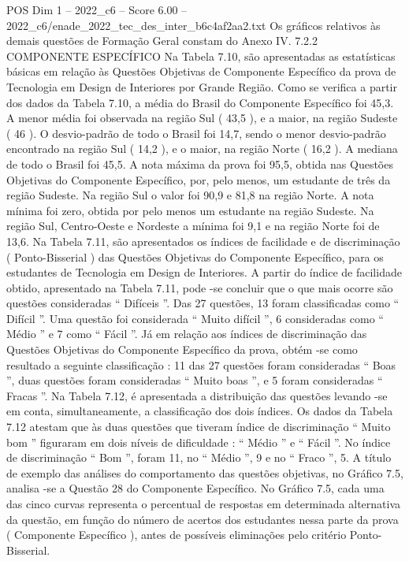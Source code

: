 \begin{textsample}{POS Dim 1 – 2022\_c6 – Score 6.00 – 2022\_c6/enade\_2022\_tec\_des\_inter\_b6c4af2aa2.txt}
Os gráficos relativos às demais questões de Formação Geral constam do Anexo IV. 7.2.2 COMPONENTE ESPECÍFICO Na Tabela 7.10, são apresentadas as estatísticas básicas em relação às Questões Objetivas de Componente Específico da prova de Tecnologia em Design de Interiores por Grande Região.
Como se verifica a partir dos dados da Tabela 7.10, a média do Brasil do Componente Específico foi 45,3.
A menor média foi observada na região Sul ( 43,5 ), e a maior, na região Sudeste ( 46 ).
O desvio-padrão de todo o Brasil foi 14,7, sendo o menor desvio-padrão encontrado na região Sul ( 14,2 ), e o maior, na região Norte ( 16,2 ).
A mediana de todo o Brasil foi 45,5.
A nota máxima da prova foi 95,5, obtida nas Questões Objetivas do Componente Específico, por, pelo menos, um estudante de três da região Sudeste.
Na região Sul o valor foi 90,9 e 81,8 na região Norte.
A nota mínima foi zero, obtida por pelo menos um estudante na região Sudeste.
Na região Sul, Centro-Oeste e Nordeste a mínima foi 9,1 e na região Norte foi de 13,6.
Na Tabela 7.11, são apresentados os índices de facilidade e de discriminação ( Ponto-Bisserial ) das Questões Objetivas do Componente Específico, para os estudantes de Tecnologia em Design de Interiores.
A partir do índice de facilidade obtido, apresentado na Tabela 7.11, pode -se concluir que o que mais ocorre são questões consideradas “ Difíceis ”.
Das 27 questões, 13 foram classificadas como “ Difícil ”.
Uma questão foi considerada “ Muito difícil ”, 6 consideradas como “ Médio ” e 7 como “ Fácil ”.
Já em relação aos índices de discriminação das Questões Objetivas do Componente Específico da prova, obtém -se como resultado a seguinte classificação : 11 das 27 questões foram consideradas “ Boas ”, duas questões foram consideradas “ Muito boas ”, e 5 foram consideradas “ Fracas ”.
Na Tabela 7.12, é apresentada a distribuição das questões levando -se em conta, simultaneamente, a classificação dos dois índices.
Os dados da Tabela 7.12 atestam que às duas questões que tiveram índice de discriminação “ Muito bom ” figuraram em dois níveis de dificuldade : “ Médio ” e “ Fácil ”.
No índice de discriminação “ Bom ”, foram 11, no “ Médio ”, 9 e no “ Fraco ”, 5.
A título de exemplo das análises do comportamento das questões objetivas, no Gráfico 7.5, analisa -se a Questão 28 do Componente Específico.
No Gráfico 7.5, cada uma das cinco curvas representa o percentual de respostas em determinada alternativa da questão, em função do número de acertos dos estudantes nessa parte da prova ( Componente Específico ), antes de possíveis eliminações pelo critério Ponto-Bisserial.

\end{textsample}
